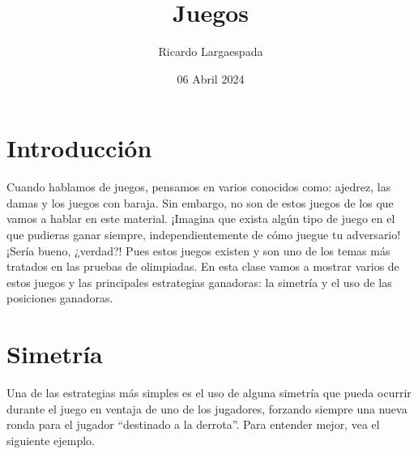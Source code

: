 \documentclass[11pt]{scrartcl}
\begin{document}
\title{Juegos}
\author{Ricardo Largaespada}
\date{06 Abril 2024}

\maketitle

\section{Introducción}

Cuando hablamos de juegos, pensamos en varios conocidos como: ajedrez, las damas y los juegos con baraja. Sin embargo, no son de estos juegos de los que vamos a hablar en este material. ¡Imagina que exista algún tipo de juego en el que pudieras ganar siempre, independientemente de cómo juegue tu adversario! ¡Sería bueno, ¿verdad?! Pues estos juegos existen y son uno de los temas más tratados en las pruebas de olimpiadas. En esta clase vamos a mostrar varios de estos juegos y las principales estrategias ganadoras: la simetría y el uso de las posiciones ganadoras.


\section{Simetría}
Una de las estrategias más simples es el uso de alguna simetría que pueda ocurrir durante el juego en ventaja de uno de los jugadores, forzando siempre una nueva ronda para el jugador ``destinado a la derrota''. Para entender mejor, vea el siguiente ejemplo.
\end{document}
